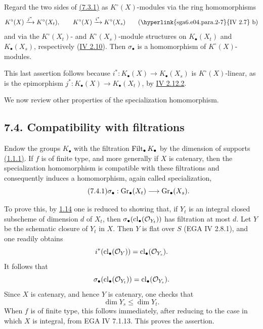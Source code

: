 Regard the two sides of \hyperlink{sga6.e10.eq.7-3-1}{(7.3.1)} as $K^\circ(X)$-modules via the ring
homomorphisms
\[
K^\circ(X)\xrightarrow{j^*}K^\circ(X_t),
\qquad
K^\circ(X)\xrightarrow{i^*}K^\circ(X_s)
\qquad\text{(\hyperlink{sga6.e04.para.2-7}{IV 2.7} b)}
\]
and via the $K^\circ(X_t)$- and $K^\circ(X_s)$-module structures on
$K_\bullet(X_t)$ and $K_\bullet(X_s)$, respectively (\hyperlink{sga6.e04.para.2-10}{IV 2.10}). Then
$\sigma_\bullet$ is a homomorphism of $K^\circ(X)$-modules.

This last assertion follows because
$i^*:K_\bullet(X)\to K_\bullet(X_s)$ is $K^\circ(X)$-linear, as is the
epimorphism $j^*:K_\bullet(X)\to K_\bullet(X_t)$, by \hyperlink{sga6.e04.eq.2-12-2}{IV 2.12.2}.

We now review other properties of the specialization homomorphism.

\subsection*{7.4. Compatibility with filtrations}
Endow the groups $K_\bullet$ with the filtration $\operatorname{Filt}_\bullet K_\bullet$
by the dimension of supports \hyperlink{sga6.e10.def.1-1-1}{(1.1.1)}. If $f$ is of finite type, and more
generally if $X$ is catenary, then the specialization homomorphism is
compatible with these filtrations and consequently induces a homomorphism,
again called specialization,
\begin{equation}\tag{7.4.1}
\sigma_\bullet:\operatorname{Gr}_\bullet(X_t)\longrightarrow\operatorname{Gr}_\bullet(X_s).
\end{equation}

To prove this, by \hyperlink{sga6.e10.cor.1-1-4}{1.14} one is reduced to showing that, if $Y_t$ is an
integral closed subscheme of dimension $d$ of $X_t$, then
$\sigma_\bullet(\operatorname{cl}_\bullet(\mathcal O_{Y_t}))$ has filtration at most
$d$. Let $Y$ be the schematic closure of $Y_t$ in $X$. Then $Y$ is flat
over $S$ (EGA IV 2.8.1), and one readily obtains
\[
i^*(\operatorname{cl}_\bullet(\mathcal O_Y))
=\operatorname{cl}_\bullet(\mathcal O_{Y_s}).
\]
It follows that
\[
\sigma_\bullet(\operatorname{cl}_\bullet(\mathcal O_{Y_t}))
=\operatorname{cl}_\bullet(\mathcal O_{Y_s}).
\]
Since $X$ is catenary, and hence $Y$ is catenary, one checks that
\[
\dim Y_s\leq\dim Y_t.
\]
When $f$ is of finite type, this follows immediately, after reducing to the
case in which $X$ is integral, from EGA IV 7.1.13. This proves the assertion.

